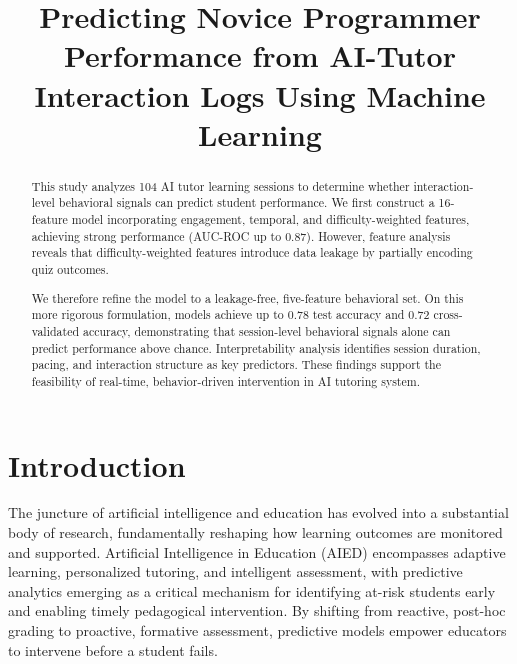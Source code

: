 \documentclass[conference]{IEEEtran}
\begin{document}
\title{Predicting Novice Programmer Performance from AI-Tutor Interaction Logs Using Machine Learning}

\author{
}

\maketitle

\begin{abstract}
This study analyzes 104 AI tutor learning sessions to determine whether interaction-level behavioral signals can predict student performance. We first construct a 16-feature model incorporating engagement, temporal, and difficulty-weighted features, achieving strong performance (AUC-ROC up to 0.87). However, feature analysis reveals that difficulty-weighted features introduce data leakage by partially encoding quiz outcomes.

We therefore refine the model to a leakage-free, five-feature behavioral set. On this more rigorous formulation, models achieve up to 0.78 test accuracy and 0.72 cross-validated accuracy, demonstrating that session-level behavioral signals alone can predict performance above chance.
Interpretability analysis identifies session duration, pacing, and interaction structure as key predictors. These findings support the feasibility of real-time, behavior-driven intervention in AI tutoring system.
\end{abstract}

\section{Introduction}


The juncture of artificial intelligence and education has evolved into a substantial body of research, fundamentally reshaping how learning outcomes are monitored and supported. Artificial Intelligence in Education (AIED) encompasses adaptive learning, personalized tutoring, and intelligent assessment, with predictive analytics emerging as a critical mechanism for identifying at-risk students early and enabling timely pedagogical intervention. By shifting from reactive, post-hoc grading to proactive, formative assessment, predictive models empower educators to intervene before a student fails.
\end{document}
